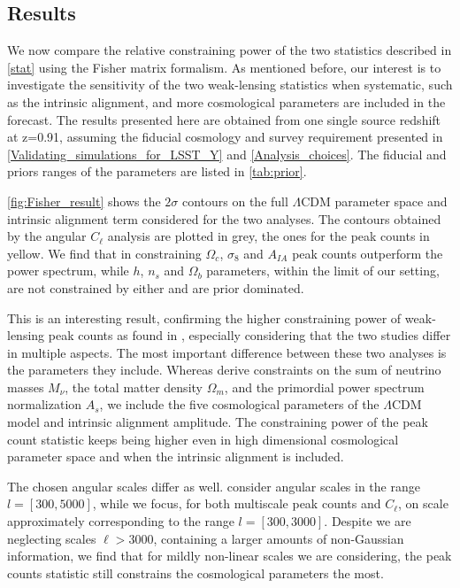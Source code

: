 \documentclass[twocolumn,twocolappendix]{aastex63}
\begin{document}
\subsection{Results} 
We now compare the relative constraining power of the two statistics described in \autoref{stat} using the Fisher matrix formalism. 
As mentioned before, our interest is to investigate the sensitivity of the two weak-lensing statistics when systematic, such as the intrinsic alignment, and more cosmological parameters are included in the forecast. 
The results presented here are obtained from one single source redshift at z=0.91, assuming the fiducial cosmology and survey requirement presented in \autoref{Validating_simulations_for_LSST_Y} and \autoref{Analysis_choices}. The fiducial and priors ranges of the parameters are listed in \autoref{tab:prior}.


\autoref{fig:Fisher_result} shows the $2\sigma$ contours on the full $\Lambda$CDM parameter space and intrinsic alignment term considered for the two analyses. 
The contours obtained by the angular $C_{\ell}$ analysis are plotted in grey, the ones for the peak counts in yellow. 
We find that in constraining $\Omega_c$, $\sigma_8$ and $A_{IA}$ peak counts outperform the power spectrum, while $h$, $n_s$ and $\Omega_b$ parameters, within the limit of our setting, are not constrained by either and are prior dominated.

This is an interesting result, confirming the higher constraining power of weak-lensing peak counts as found in \cite{ajani2020constraining}, especially considering that the two studies differ in multiple aspects. 
The most important difference between these two analyses is the parameters they include. Whereas \cite{ajani2020constraining} derive constraints on the sum of neutrino masses $M_{\nu}$, the total matter density $\Omega_m$, and the primordial power spectrum normalization $A_s$, we include the five cosmological parameters of the $\Lambda$CDM model and intrinsic alignment amplitude. 
The constraining power of the peak count statistic keeps being higher even in high dimensional cosmological parameter space and when the intrinsic alignment is included. 

The chosen angular scales differ as well. \cite{ajani2020constraining} consider angular scales in the range $l = [300,5000]$, while we focus, for both multiscale peak counts and $C_{\ell}$, on scale approximately corresponding to the range $l = [300,3000]$. Despite we are neglecting scales $\ell>3000$, containing a larger amounts of
non-Gaussian information, we find that for mildly non-linear scales we are considering, the peak counts statistic still constrains the cosmological parameters the most. 
\end{document}
